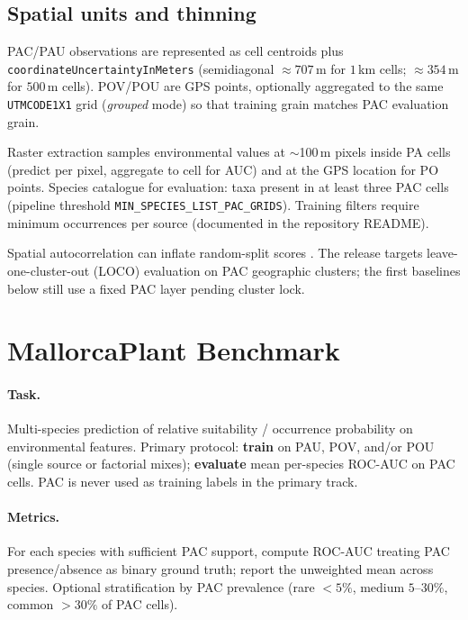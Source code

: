 \documentclass[11pt,letterpaper]{article}
\begin{document}
\subsection{Spatial units and thinning}
\label{sec:spatial}

PAC/PAU observations are represented as cell centroids plus \texttt{coordinateUncertaintyInMeters} (semidiagonal $\approx 707$\,m for $1$\,km cells; $\approx 354$\,m for $500$\,m cells).
POV/POU are GPS points, optionally aggregated to the same \texttt{UTMCODE1X1} grid (\emph{grouped} mode) so that training grain matches PAC evaluation grain.

Raster extraction samples environmental values at $\sim$100\,m pixels inside PA cells (predict per pixel, aggregate to cell for AUC) and at the GPS location for PO points.
Species catalogue for evaluation: taxa present in at least three PAC cells (pipeline threshold \texttt{MIN\_SPECIES\_LIST\_PAC\_GRIDS}).
Training filters require minimum occurrences per source (documented in the repository README).

Spatial autocorrelation can inflate random-split scores \citep{KOLDASBAYEVA2025103521}.
The release targets leave-one-cluster-out (LOCO) evaluation on PAC geographic clusters; the first baselines below still use a fixed PAC layer pending cluster lock.


\section{MallorcaPlant Benchmark}
\label{sec:benchmark}

\paragraph{Task.}
Multi-species prediction of relative suitability / occurrence probability on environmental features.
Primary protocol: \textbf{train} on PAU, POV, and/or POU (single source or factorial mixes); \textbf{evaluate} mean per-species ROC-AUC on PAC cells.
PAC is never used as training labels in the primary track.

\paragraph{Metrics.}
For each species with sufficient PAC support, compute ROC-AUC treating PAC presence/absence as binary ground truth; report the unweighted mean across species.
Optional stratification by PAC prevalence (rare $<5\%$, medium $5$--$30\%$, common $>30\%$ of PAC cells).
\end{document}
